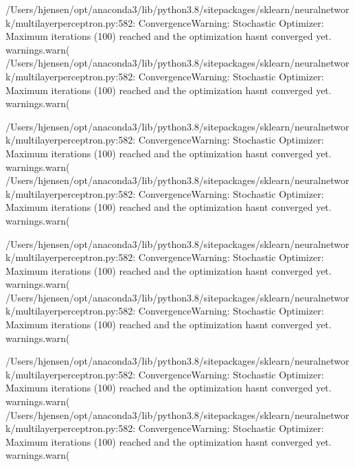 \documentclass[letterpaper,10pt,english]{sphinxmanual}
\begin{document}
\begin{sphinxVerbatim}[commandchars=\\\{\}]
/Users/hjensen/opt/anaconda3/lib/python3.8/site\PYGZhy{}packages/sklearn/neural\PYGZus{}network/\PYGZus{}multilayer\PYGZus{}perceptron.py:582: ConvergenceWarning: Stochastic Optimizer: Maximum iterations (100) reached and the optimization hasn\PYGZsq{}t converged yet.
  warnings.warn(
/Users/hjensen/opt/anaconda3/lib/python3.8/site\PYGZhy{}packages/sklearn/neural\PYGZus{}network/\PYGZus{}multilayer\PYGZus{}perceptron.py:582: ConvergenceWarning: Stochastic Optimizer: Maximum iterations (100) reached and the optimization hasn\PYGZsq{}t converged yet.
  warnings.warn(
\end{sphinxVerbatim}

\begin{sphinxVerbatim}[commandchars=\\\{\}]
/Users/hjensen/opt/anaconda3/lib/python3.8/site\PYGZhy{}packages/sklearn/neural\PYGZus{}network/\PYGZus{}multilayer\PYGZus{}perceptron.py:582: ConvergenceWarning: Stochastic Optimizer: Maximum iterations (100) reached and the optimization hasn\PYGZsq{}t converged yet.
  warnings.warn(
/Users/hjensen/opt/anaconda3/lib/python3.8/site\PYGZhy{}packages/sklearn/neural\PYGZus{}network/\PYGZus{}multilayer\PYGZus{}perceptron.py:582: ConvergenceWarning: Stochastic Optimizer: Maximum iterations (100) reached and the optimization hasn\PYGZsq{}t converged yet.
  warnings.warn(
\end{sphinxVerbatim}

\begin{sphinxVerbatim}[commandchars=\\\{\}]
/Users/hjensen/opt/anaconda3/lib/python3.8/site\PYGZhy{}packages/sklearn/neural\PYGZus{}network/\PYGZus{}multilayer\PYGZus{}perceptron.py:582: ConvergenceWarning: Stochastic Optimizer: Maximum iterations (100) reached and the optimization hasn\PYGZsq{}t converged yet.
  warnings.warn(
/Users/hjensen/opt/anaconda3/lib/python3.8/site\PYGZhy{}packages/sklearn/neural\PYGZus{}network/\PYGZus{}multilayer\PYGZus{}perceptron.py:582: ConvergenceWarning: Stochastic Optimizer: Maximum iterations (100) reached and the optimization hasn\PYGZsq{}t converged yet.
  warnings.warn(
\end{sphinxVerbatim}

\begin{sphinxVerbatim}[commandchars=\\\{\}]
/Users/hjensen/opt/anaconda3/lib/python3.8/site\PYGZhy{}packages/sklearn/neural\PYGZus{}network/\PYGZus{}multilayer\PYGZus{}perceptron.py:582: ConvergenceWarning: Stochastic Optimizer: Maximum iterations (100) reached and the optimization hasn\PYGZsq{}t converged yet.
  warnings.warn(
/Users/hjensen/opt/anaconda3/lib/python3.8/site\PYGZhy{}packages/sklearn/neural\PYGZus{}network/\PYGZus{}multilayer\PYGZus{}perceptron.py:582: ConvergenceWarning: Stochastic Optimizer: Maximum iterations (100) reached and the optimization hasn\PYGZsq{}t converged yet.
  warnings.warn(
\end{sphinxVerbatim}
\end{document}
